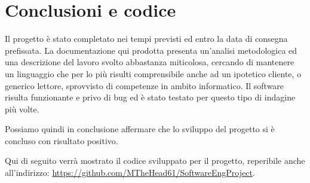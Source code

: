 \documentclass[12pt]{article}
\begin{document}
\section{Conclusioni e codice}
Il progetto è stato completato nei tempi previsti ed entro la data di consegna prefissata. La documentazione qui prodotta presenta un'analisi metodologica ed una descrizione del lavoro svolto abbastanza miticolosa, cercando di mantenere un linguaggio che per lo più risulti comprensibile anche ad un ipotetico cliente, o generico lettore, sprovvisto di competenze in ambito informatico. Il software risulta funzionante e privo di bug ed è stato testato per questo tipo di indagine più volte.

Possiamo quindi in conclusione affermare che lo sviluppo del progetto si è concluso con risultato positivo.

Qui di seguito verrà mostrato il codice sviluppato per il progetto, reperibile anche all'indirizzo: \url{https://github.com/MTheHead61/SoftwareEngProject}.
\end{document}
